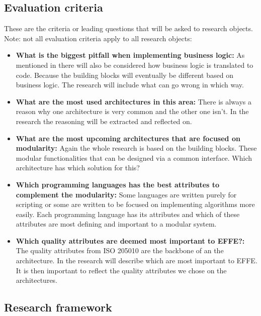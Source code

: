 \subsection{Evaluation criteria}
These are the criteria or leading questions that will be asked to research objects. Note: not all evaluation criteria apply to all research objects:

\begin{itemize}
	\item \textbf{What is the biggest pitfall when implementing business logic: }As mentioned in  there will also be considered how business logic is translated to code. Because the building blocks will eventually be different based on business logic. The research will include what can go wrong in which way.

	\item \textbf{What are the most used architectures in this area: }There is always a reason why one architecture is very common and the other one isn't. In the research the reasoning will be extracted and reflected on.

	\item \textbf{What are the most upcoming architectures that are focused on modularity: }Again the whole research is based on the building blocks. These modular functionalities that can be designed via a common interface. Which architecture has which solution for this?

	\item \textbf{Which programming languages has the best attributes to complement the modularity: }Some languages are written purely for scripting or some are written to be focused on implementing algorithms more easily. Each programming language has its attributes and which of these attributes are most defining and important to a modular system.

	\item \textbf{Which quality attributes are deemed most important to EFFE?: }The quality attributes from ISO 205010 \cite{iso25010} are the backbone of an the architecture. In the research will describe which are most important to EFFE. It is then important to reflect the quality attributes we chose on the architectures.
\end{itemize}

\subsection{Research framework}

